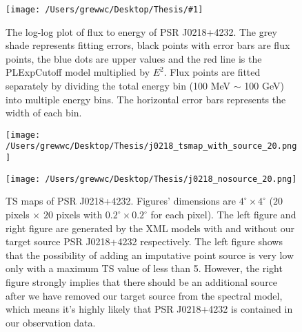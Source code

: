 \documentclass[12pt]{report}
\newcommand{\singleFig}[3]{
  \begin{figure}[!ht]
    \centering
    \texttt{[image: /Users/grewwc/Desktop/Thesis/\#1]}
    \caption{#3}
    \label{fig: #1}
  \end{figure}
}
\newcommand{\change}[1]{
  $<$\colorbox{red}{\textbf{change}}$>$#1$<$\colorbox{red}{\textbf{/change}}$>$
}
\begin{document}
            \singleFig{j0218_cur.png}{0.40}{The log-log plot of flux to energy of PSR J0218+4232. The grey shade represents 
              fitting errors, black points with error bars are flux points, the blue dots are upper values and the 
              red line is the PLExpCutoff model multiplied by $E^2$. Flux points 
              are fitted separately by dividing the total energy bin (100 MeV $\sim$ 100 GeV) into multiple energy bins.
              The horizontal error bars represents the width of each bin. }
            \vspace{1cm}
            \begin{figure}[!ht]
              \begin{center}
              \begin{minipage}{0.46\textwidth}
                \begin{center} 
                  \texttt{[image: /Users/grewwc/Desktop/Thesis/j0218\_tsmap\_with\_source\_20.png]}
                \end{center}
              \end{minipage}
              \begin{minipage}{0.45\textwidth}
                \begin{center}
                  \texttt{[image: /Users/grewwc/Desktop/Thesis/j0218\_nosource\_20.png]}
                \end{center}
              \end{minipage}
            \end{center}
            \caption{TS maps of PSR J0218+4232. Figures' dimensions are 
            $4^{\circ} \times 4^{\circ}$ ($20$ pixels $\times$ $20$ pixels with 
            $0.2^{\circ} \times 0.2^{\circ}$ for each pixel). The \textsf{left}
            figure and \textsf{right} figure are generated by the XML models with and without our 
            target source PSR J0218+4232 respectively. The \textsf{left} figure shows that the 
            possibility of adding an imputative point source is very low only with a maximum TS value of 
            less than 5. However, the \textsf{right} figure strongly implies that there should be an 
            additional source after we have removed our target source from the spectral model, 
            which means it's highly likely that PSR J0218+4232 is contained in our observation data.}
            \label{fig: j0218_tsmap_comparison_20}
            \end{figure}
\end{document}
